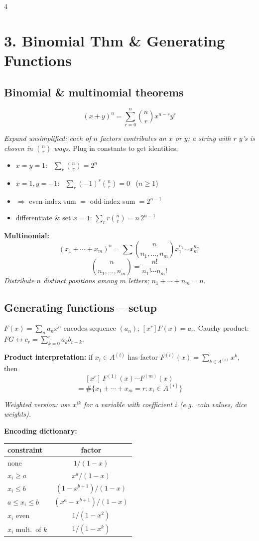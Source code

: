 \documentclass[8pt]{extarticle}
\newcommand{\note}[1]{{\footnotesize\color{gray!70!black}\emph{#1}}}
\begin{document}
\begin{multicols}{4}
\columnbreak
\section{3. Binomial Thm \& Generating Functions}

\subsection*{Binomial \& multinomial theorems}
\begin{key}
\[(x+y)^n=\sum_{r=0}^n\binom{n}{r}x^{n-r}y^r\]
\end{key}
\note{Expand unsimplified: each of $n$ factors contributes an $x$ or $y$; a string with $r$ $y$'s is chosen in $\binom nr$ ways.}
Plug in constants to get identities:
\begin{itemize}
\item $x=y=1$: \ $\sum_r\binom{n}{r}=2^n$
\item $x=1,y=-1$: \ $\sum_r(-1)^r\binom{n}{r}=0$ \ ($n\ge1$)
\item $\Rightarrow$ even-index sum $=$ odd-index sum $=2^{n-1}$
\item differentiate \& set $x=1$: $\sum_r r\binom{n}{r}=n\,2^{n-1}$
\end{itemize}
\textbf{Multinomial:}
\[(x_1{+}\cdots{+}x_m)^n=\sum \binom{n}{n_1,\dots,n_m}x_1^{n_1}\cdots x_m^{n_m}\]
\[\binom{n}{n_1,\dots,n_m}=\frac{n!}{n_1!\cdots n_m!}\]
\note{Distribute $n$ distinct positions among $m$ letters; $n_1{+}\cdots{+}n_m=n$.}

\subsection*{Generating functions -- setup}
$F(x)=\sum_n a_nx^n$ encodes sequence $(a_n)$; $[x^r]F(x)=a_r$.
Cauchy product: $FG\leftrightarrow c_r=\sum_{k=0}^r a_kb_{r-k}$.

\begin{key}
\textbf{Product interpretation:} if $x_i\in A^{(i)}$ has factor $F^{(i)}(x)=\sum_{k\in A^{(i)}}x^k$, then
\[[x^r]\,F^{(1)}(x)\cdots F^{(m)}(x)\]
\[= \#\{x_1+\cdots+x_m=r : x_i\in A^{(i)}\}\]
\end{key}
\note{Weighted version: use $x^{ik}$ for a variable with coefficient $i$ (e.g.\ coin values, dice weights).}

\textbf{Encoding dictionary:}
\begin{tab}
\centering\renewcommand{\arraystretch}{1.5}
\begin{tabular}{@{}l c@{}}
\toprule
constraint & factor \\ \midrule
none & $1/(1-x)$ \\
$x_i\ge a$ & $x^a/(1-x)$ \\
$x_i\le b$ & $(1-x^{b+1})/(1-x)$ \\
$a\le x_i\le b$ & $(x^a-x^{b+1})/(1-x)$ \\
$x_i$ even & $1/(1-x^2)$ \\
$x_i$ mult.\ of $k$ & $1/(1-x^k)$ \\
\bottomrule
\end{tabular}
\end{tab}


\end{multicols}
\end{document}
